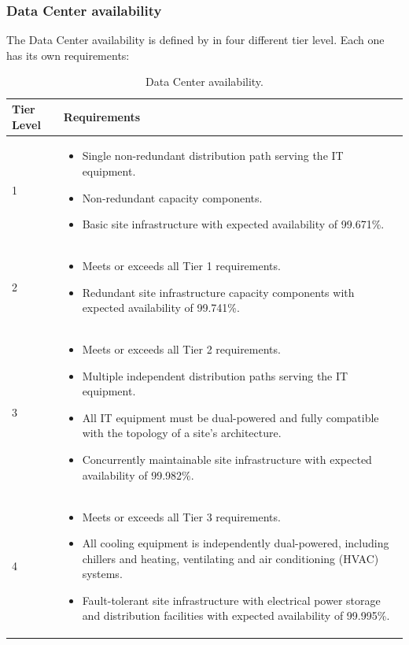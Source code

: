 \newpage

\subsubsection{Data Center availability}

The Data Center availability is defined by in four different tier level. Each one has its own requirements:
\begin{table}[!htp]
	\centering
	\begin{tabular}{@{} p{5em} p{25em} @{}}
		\toprule
		\textbf{Tier Level} & \textbf{Requirements} \\
		\midrule
		1 & \vspace{-1.5em}\begin{itemize}
			\item Single non-redundant distribution path serving the IT equipment.
			\item Non-redundant capacity components.
			\item Basic site infrastructure with expected availability of 99.671\%.
		\end{itemize} \\
		\cmidrule{1-2}
		2 & \vspace{-1.5em}\begin{itemize}
			\item Meets or exceeds all Tier 1 requirements.
			\item Redundant site infrastructure capacity components with expected availability of 99.741\%.
		\end{itemize} \\
		\cmidrule{1-2}
		3 & \vspace{-1.5em}\begin{itemize}
			\item Meets or exceeds all Tier 2 requirements.
			\item Multiple independent distribution paths serving the IT equipment.
			\item All IT equipment must be dual-powered and fully compatible with the topology of a site's architecture.
			\item Concurrently maintainable site infrastructure with expected availability of 99.982\%.
		\end{itemize} \\
		\cmidrule{1-2}
		4 & \vspace{-1.5em}\begin{itemize}
			\item Meets or exceeds all Tier 3 requirements.
			\item All cooling equipment is independently dual-powered, including chillers and heating, ventilating and air conditioning (HVAC) systems.
			\item Fault-tolerant site infrastructure with electrical power storage and distribution facilities with expected availability of 99.995\%.
		\end{itemize} \\
		\bottomrule
	\end{tabular}
	\caption{Data Center availability.}
\end{table}